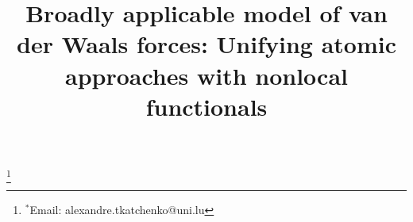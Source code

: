 

\title{Broadly applicable model of van der Waals forces: Unifying atomic approaches with nonlocal functionals}




\begingroup
\renewcommand\thefootnote{}\footnote{$^*$Email: alexandre.tkatchenko@uni.lu}%
\addtocounter{footnote}{-1}%
\endgroup



\begingroup
\setlength\bibsep{0pt}
\renewcommand{\section}[2]{}
\footnotesize

\endgroup


